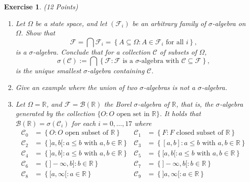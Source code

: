\documentclass[DIV=classic,a4paper,10pt]{scrartcl}
\newtheorem{exercise}[theorem]{Exercise}
\theoremstyle{nonumberplain}
\numberwithin{equation}{section}
\begin{document}
\begin{exercise} (12 Points) 
    \begin{enumerate}[label=(\alph*), fullwidth]
        \item Let $\Omega$ be a state space, and let $(\mathcal{F}_i)$ be an arbitrary family of $\sigma$-algebra on $\Omega$.
            Show that 
            \begin{equation*}
              \mathcal{F}=\bigcap \mathcal{F}_i=\left\{A \subseteq \Omega\colon A \in \mathcal{F}_i \text{ for all }i\right\},
            \end{equation*}
            is a $\sigma$-algebra.
            Conclude that for a collection $\mathcal{C}$ of subsets of $\Omega$,
            \begin{equation*}
                \sigma\left(\mathcal{C}\right):=\bigcap\left\{\mathcal{F}\colon \mathcal{F}\text{ is a }\sigma\text{-algebra with } \mathcal{C}\subseteq \mathcal{F}\right\},
            \end{equation*}
            is the unique smallest $\sigma$-algebra containing $\mathcal{C}$.
        \item Give an example where the union of two $\sigma$-algebras is not a $\sigma$-algebra.
        \item 
            Let $\Omega=\mathbb{R}$, and $\mathcal{F}=\mathcal{B}(\mathbb{R})$ the Borel $\sigma$-algebra of $\mathbb{R}$, that is, the $\sigma$-algebra generated by the collection $\{O\colon O \text{ open set in }\mathbb{R}\}$.
            It holds that $\mathcal{B}(\mathbb{R})=\sigma(\mathcal{C}_i)$ for each $i=0,\ldots,17$ where
            \begin{align*}
                \mathcal{C}_0&=\left\{O\colon O\text{ open subset of }\mathbb{R}\right\} &  \mathcal{C}_1&=\left\{F\colon F\text{ closed subset of }\mathbb{R}\right\} \\
                \mathcal{C}_2&=\left\{]a,b[\colon a\leq b \text{ with } a,b\in \mathbb{R}\right\} & \mathcal{C}_3&=\left\{[a,b]\colon a\leq b \text{ with } a,b\in \mathbb{R}\right\}\\
                \mathcal{C}_4&=\left\{]a,b]\colon a\leq b \text{ with } a,b\in \mathbb{R}\right\} & \mathcal{C}_5&=\left\{[a,b[\colon a\leq b \text{ with } a,b\in \mathbb{R}\right\}\\
                \mathcal{C}_6&=\left\{]-\infty,b]\colon b\in \mathbb{R}\right\} & \mathcal{C}_7&=\left\{]-\infty,b[\colon b\in \mathbb{R}\right\}\\
                \mathcal{C}_8&=\left\{[a,\infty[\colon a\in \mathbb{R}\right\} & \mathcal{C}_9&=\left\{]a,\infty[\colon a\in \mathbb{R}\right\}\\

\end{align*}
\end{enumerate}
\end{exercise}
\end{document}
